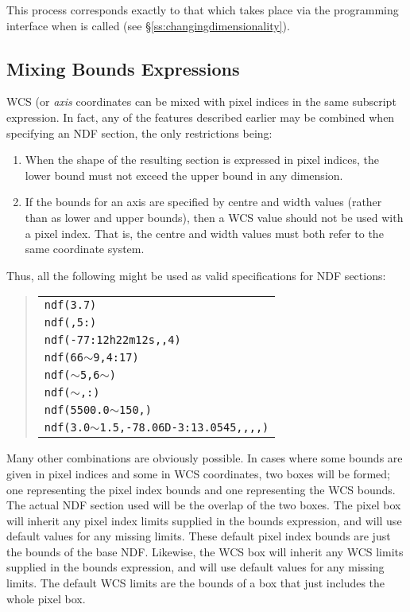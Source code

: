 \documentclass[twoside,11pt,nolof]{starlink}
\providecommand{\st}[1]{{\emph{#1}}}
\providecommand{\hi}[1]{{\texttt{#1}}}
\begin{document}
This process corresponds exactly to that which takes place via the
programming interface when  is called (see
\S\ref{ss:changingdimensionality}).

\subsection{Mixing Bounds Expressions}

WCS (or \st{axis\/} coordinates can be mixed with pixel indices in the same
subscript expression. In fact, any of
the features described earlier may be combined when specifying an NDF section,
the only restrictions being:

\begin{enumerate}
\item When the shape of the resulting section is
expressed in pixel indices, the lower bound must not exceed the upper bound in
any dimension.
\item If the bounds for an axis are specified by centre and width values
(rather than as lower and upper bounds), then a WCS value should not be
used with a pixel index. That is, the centre and width values must both
refer to the same coordinate system.
\end{enumerate}

Thus, all the following might be used as valid specifications for
NDF sections:

\small
\begin{quote}
\begin{center}
\begin{tabular}{l}
\hi{ndf(3.7)}\\
\hi{ndf(,5:)}\\
\hi{ndf(-77:12h22m12s,,4)}\\
\hi{ndf(66}$\sim$\hi{9,4:17)}\\
\hi{ndf(}$\sim$\hi{5,6}$\sim$\hi{)}\\
\hi{ndf(}$\sim$\hi{,:)}\\
\hi{ndf(5500.0}$\sim$\hi{150,)}\\
\hi{ndf(3.0}$\sim$\hi{1.5,-78.06D-3:13.0545,,,,)}\\
\end{tabular}
\end{center}
\end{quote}
\normalsize

Many other combinations are obviously possible. In cases where some
bounds are given in pixel indices and some in WCS coordinates, two boxes
will be formed; one representing the pixel index bounds and one
representing the WCS bounds. The actual NDF section used will be the
overlap of the two boxes. The pixel box will inherit any pixel index
limits supplied in the bounds expression, and will use default values for
any missing limits. These default pixel index bounds are just the bounds
of the base NDF. Likewise, the WCS box will inherit any WCS limits
supplied in the bounds expression, and will use default values for any
missing limits. The default WCS limits are the bounds of a box that just
includes the whole pixel box.
\end{document}

